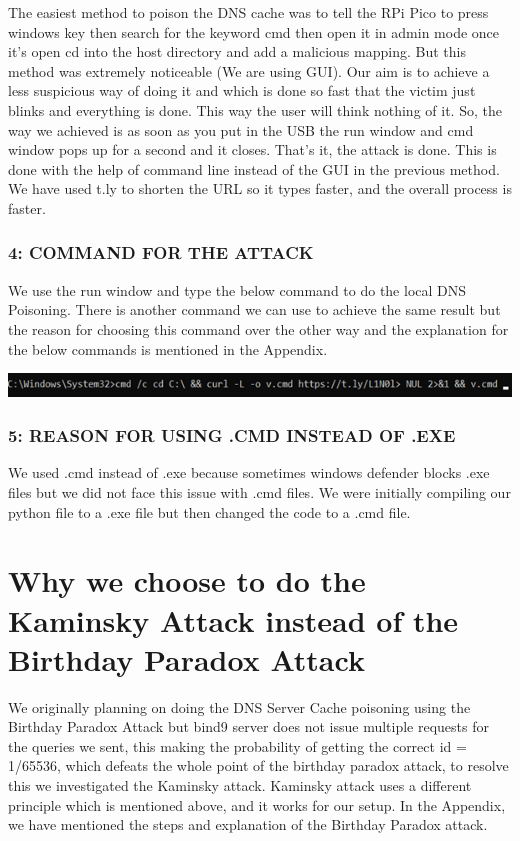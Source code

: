 \documentclass[11pt]{report}
\begin{document}
The easiest method to poison the DNS cache was to tell the RPi Pico to press
windows key then search for the keyword cmd then open it in admin mode once
it's open cd into the host directory and add a malicious mapping. But this
method was extremely noticeable (We are using GUI). Our aim is to achieve a
less suspicious way of doing it and which is done so fast that the victim just
blinks and everything is done. This way the user will think nothing of it. So,
the way we achieved is as soon as you put in the USB the run window and cmd
window pops up for a second and it closes. That's it, the attack is done. This
is done with the help of command line instead of the GUI in the previous
method. We have used t.ly to shorten the URL so it types faster, and the
overall process is faster.

\subsubsection*{4: COMMAND FOR THE ATTACK}

We use the run window and type the below command to do the local DNS Poisoning.
There is another command we can use to achieve the same result but the reason
for choosing this command over the other way and the explanation for the below
commands is mentioned in the Appendix.

\includegraphics{Figures/cmd.png}

\subsubsection*{5: REASON FOR USING .CMD INSTEAD OF .EXE}

We used .cmd instead of .exe because sometimes windows defender blocks .exe
files but we did not face this issue with .cmd files. We were initially
compiling our python file to a .exe file but then changed the code to a .cmd
file.

\section*{Why we choose to do the Kaminsky Attack instead of the Birthday Paradox Attack}

We originally planning on doing the DNS Server Cache poisoning using the
Birthday Paradox Attack but bind9 server does not issue multiple requests for
the queries we sent, this making the probability of getting the correct id =
1/65536, which defeats the whole point of the birthday paradox attack, to
resolve this we investigated the Kaminsky attack. Kaminsky attack uses a
different principle which is mentioned above, and it works for our setup. In
the Appendix, we have mentioned the steps and explanation of the Birthday
Paradox attack.
\end{document}
